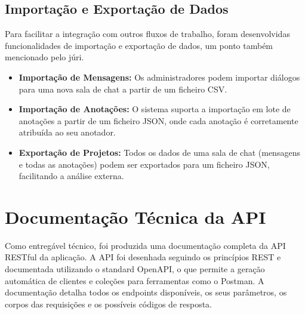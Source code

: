 \subsection{Importação e Exportação de Dados}

Para facilitar a integração com outros fluxos de trabalho, foram desenvolvidas funcionalidades de importação e exportação de dados, um ponto também mencionado pelo júri.
\begin{itemize}
    \item \textbf{Importação de Mensagens:} Os administradores podem importar diálogos para uma nova sala de chat a partir de um ficheiro CSV.
    \item \textbf{Importação de Anotações:} O sistema suporta a importação em lote de anotações a partir de um ficheiro JSON, onde cada anotação é corretamente atribuída ao seu anotador.
    \item \textbf{Exportação de Projetos:} Todos os dados de uma sala de chat (mensagens e todas as anotações) podem ser exportados para um ficheiro JSON, facilitando a análise externa.
\end{itemize}

\section{Documentação Técnica da API}

Como entregável técnico, foi produzida uma documentação completa da API RESTful da aplicação. A API foi desenhada seguindo os princípios REST e documentada utilizando o standard OpenAPI, o que permite a geração automática de clientes e coleções para ferramentas como o Postman. A documentação detalha todos os endpoints disponíveis, os seus parâmetros, os corpos das requisições e os possíveis códigos de resposta.

